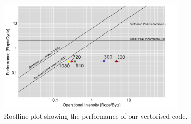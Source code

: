 \begin{figure} 
    \centering
    \includegraphics[width=0.85\textwidth]{figures/roofline}
    \caption{Roofline plot showing the performance of our vectorised code. }
    \label{fig:roofline}
\end{figure}


